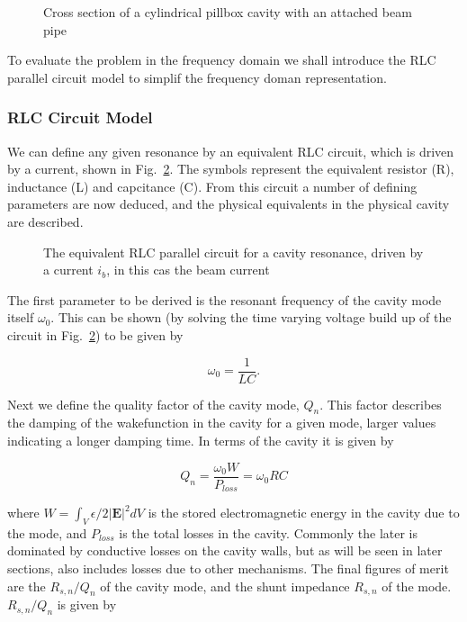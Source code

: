 \begin{figure}

\caption{Cross section of a cylindrical pillbox cavity with an attached beam pipe}
\label{fig:cylin_geo_diagram}
\end{figure}

To evaluate the problem in the frequency domain we shall introduce the RLC parallel circuit model to simplif the frequency doman representation.

\subsubsection{RLC Circuit Model}

We can define any given resonance by an equivalent RLC circuit, which is driven by a current, shown in Fig.~\ref{fig:rlc_circ}. The symbols represent the equivalent resistor (R), inductance (L) and capcitance (C). From this circuit a number of defining parameters are now deduced, and the physical equivalents in the physical cavity are described.

\begin{figure}

\caption{The equivalent RLC parallel circuit for a cavity resonance, driven by a current $i_{b}$, in this cas the beam current}
\label{fig:rlc_circ}
\end{figure}

The first parameter to be derived is the resonant frequency of the cavity mode itself $\omega_{0}$. This can be shown (by solving the time varying voltage build up of the circuit in Fig.~\ref{fig:rlc_circ}) to be given by

\begin{equation}
\omega_{0} = \frac{1}{LC}.
\end{equation}

Next we define the quality factor of the cavity mode, $Q_{n}$. This factor describes the damping of the wakefunction in the cavity for a given mode, larger values indicating a longer damping time. In terms of the cavity it is given by

\begin{equation}
Q_{n} = \frac{\omega_{0} W}{P_{loss}} = \omega_{0}RC
\end{equation}

where $W = \int_{V} \epsilon / 2 \left| \mathbf{E} \right|^{2} dV$ is the stored electromagnetic energy in the cavity due to the mode, and $P_{loss}$ is the total losses in the cavity. Commonly the later is dominated by conductive losses on the cavity walls, but as will be seen in later sections, also includes losses due to other mechanisms. The final figures of merit are the $R_{s, n}/Q_{n}$ of the cavity mode, and the shunt impedance $R_{s, n}$ of the mode. $R_{s, n}/Q_{n}$ is given by


